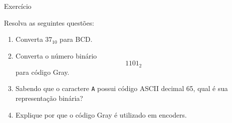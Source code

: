 \begin{frame}{Exercício}
    \small

    Resolva as seguintes questões:

    \begin{enumerate}
        \item Converta $37_{10}$ para BCD.

        \vspace{0.3cm}

        \item Converta o número binário
        \[
            1101_2
        \]
        para código Gray.

        \vspace{0.3cm}

        \item Sabendo que o caractere \texttt{A} possui código ASCII
        decimal 65, qual é sua representação binária?

        \vspace{0.3cm}

        \item Explique por que o código Gray é utilizado em encoders.
    \end{enumerate}

\end{frame}